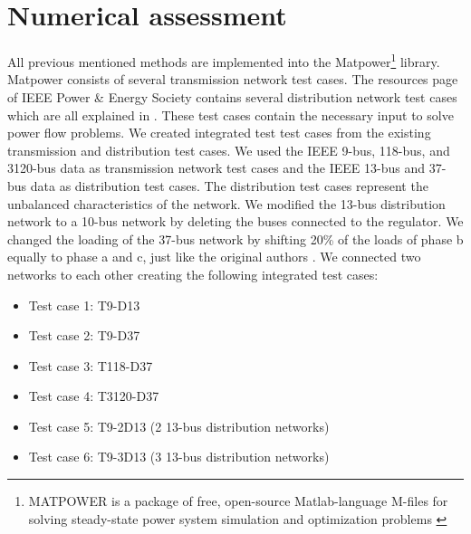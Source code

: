 \documentclass[10pt,journal]{article}
\begin{document}
\section{Numerical assessment}
All previous mentioned methods are implemented into the Matpower\footnote{MATPOWER is a package of free, open-source Matlab-language M-files for solving steady-state power system simulation and optimization problems \cite{Zimmerman2011}} library. Matpower consists of several transmission network test cases. The resources page of IEEE Power \& Energy Society  contains several distribution network test cases which are all explained in \cite{Schneider2018}. These test cases contain the necessary input to solve power flow problems. We created integrated test test cases from the existing transmission and distribution test cases. We used the IEEE 9-bus, 118-bus, and 3120-bus data as transmission network test cases and the IEEE 13-bus and 37-bus data as distribution test cases. The distribution test cases represent the unbalanced characteristics of the network. We modified the 13-bus distribution network to a 10-bus network by deleting the buses connected to the regulator. We changed the loading of the 37-bus network by shifting 20\% of the loads of phase b equally to phase a and c, just like the original authors \cite{Taranto2008}.
We connected two networks to each other creating the following integrated test cases: 
\begin{itemize}
    \item Test case 1: T9-D13
    \item Test case 2: T9-D37
    \item Test case 3: T118-D37
    \item Test case 4: T3120-D37
    \item Test case 5: T9-2D13 (2 13-bus distribution networks) 
    \item Test case 6: T9-3D13 (3 13-bus distribution networks) 
\end{itemize}
\end{document}
